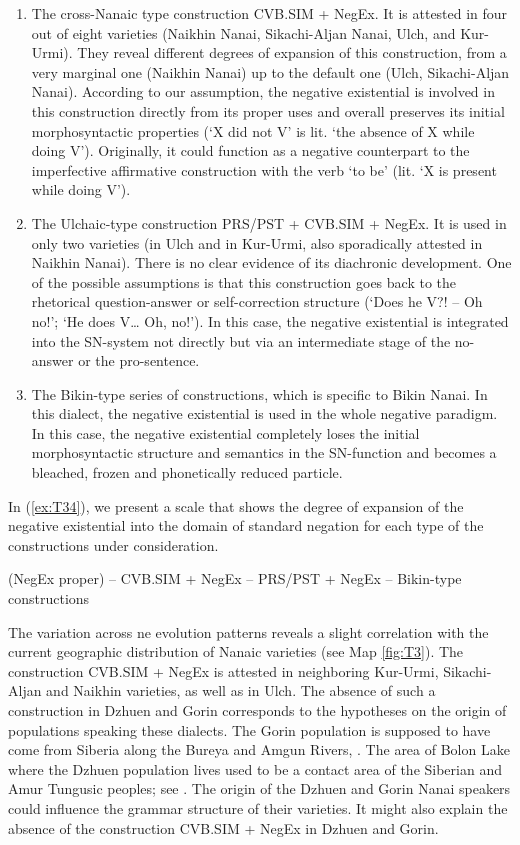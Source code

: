 \documentclass[output=paper]{langscibook}
\begin{document}
\begin{enumerate}[label=(\alph*)]
    \item The cross-Nanaic type construction CVB.SIM + NegEx. It is attested in four out of eight varieties (Naikhin Nanai, Sikachi-Aljan Nanai, Ulch, and Kur-Urmi). They reveal different degrees of expansion of this construction, from a very marginal one (Naikhin Nanai) up to the default one (Ulch, Sikachi-Aljan Nanai). According to our assumption, the negative existential is involved in this construction directly from its proper uses and overall preserves its initial morphosyntactic properties (‘X did not V’ is lit. ‘the absence of X while doing V’). Originally, it could function as a negative counterpart to the imperfective affirmative construction with the verb ‘to be’ (lit. ‘X is present while doing V’).
    \item The Ulchaic-type construction PRS/PST + CVB.SIM + NegEx. It is used in only two varieties (in Ulch and in Kur-Urmi, also sporadically attested in Naikhin Nanai). There is no clear evidence of its diachronic development. One of the possible assumptions is that this construction goes back to the rhetorical question-answer or self-correction structure (‘Does he V?! – Oh no!’; ‘He does V… Oh, no!’). In this case, the negative existential is integrated into the SN-system not directly but via an intermediate stage of the no-answer or the pro-sentence.
    \item The Bikin-type series of constructions, which is specific to Bikin Nanai. In this dialect, the negative existential is used in the whole negative paradigm. In this case, the negative existential completely loses the initial morphosyntactic structure and semantics in the SN-function and becomes a bleached, frozen and phonetically reduced particle.
\end{enumerate}

In (\ref{ex:T34}), we present a scale that shows the degree of expansion of the negative existential into the domain of standard negation for each type of the constructions under consideration.

\begin{exe}\label{ex:T34}
    \ex (NegEx proper) – CVB.SIM + NegEx – PRS/PST + NegEx – Bikin-type constructions
\end{exe}

The variation across ne evolution patterns reveals a slight correlation with the current geographic distribution of Nanaic varieties (see Map \ref{fig:T3}). The construction CVB.SIM + NegEx is attested in neighboring Kur-Urmi, Sikachi-Aljan and Naikhin varieties, as well as in Ulch. The absence of such a construction in Dzhuen and Gorin corresponds to the hypotheses on the origin of populations speaking these dialects. The Gorin population is supposed to have come from Siberia along the Bureya and Amgun Rivers, \citet[135]{maltseva2019a}. The area of Bolon Lake where the Dzhuen population lives used to be a contact area of the Siberian and Amur Tungusic peoples; see \citet{maltseva2019a}. The origin of the Dzhuen and Gorin Nanai speakers could influence the grammar structure of their varieties. It might also explain the absence of the construction CVB.SIM + NegEx in Dzhuen and Gorin.
\end{document}

